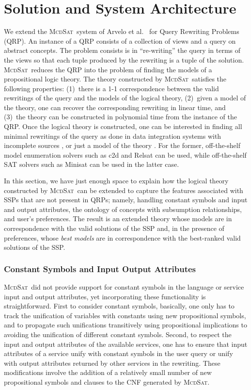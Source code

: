 \documentclass{llncs}
\newcommand{\mcdsat}{\textsc{McdSat}}
\begin{document}
\section{Solution and System Architecture}

We extend the \mcdsat\ system of Arvelo et al.\ \cite{arvelo:aaai06} for
Query Rewriting Problems (QRP). An instance of a QRP consists of a
collection of views and a query on abstract concepts. 
The problem consists is in ``re-writing'' the query in terms of the
views so that each tuple produced by the rewriting is a tuple of the
solution.
\mcdsat\ reduces the QRP into the problem of finding the models of
a propositional logic theory.
The theory constructed by \mcdsat\ satisfies the following properties:
(1)~there is a 1-1 correspondence between the valid rewritings of the
query and the models of the logical theory, (2)~given a model of the theory,
one can recover the corresponding rewriting in linear time, and
(3)~the theory can be constructed in polynomial time from the instance 
of the QRP.
Once the logical theory is constructed, one can be interested in finding
all minimal rewritings of the query as done in data integration systems
with incomplete sources \cite{Ullman00}, or just a model of the theory
\cite{refs}. For the former, off-the-shelf model enumeration solvers
such as c2d \cite{c2d} and Relsat \cite{relsat} can be used, while 
off-the-shelf SAT solvers such as Minisat \cite{minisat} can be used in the
latter case.

In this section, we have just enough space to explain how the logical
theory constructed by \mcdsat\ can be extended to capture the features
associated with SSPs that are not present in QRPs; namely, handling
constant symbols and input and output attributes, the ontology of
concepts with subsumption relationships, and user's preferences. The
result is an extended theory whose models are in correspondence with
the valid solutions of the SSP and, in the presence of preferences,
whose \emph{best models} are in correspondence with the best-ranked
valid solutions of the SSP.

\subsubsection{Constant Symbols and Input Output Attributes}

\mcdsat\ did not provide support for constant symbols in the language
or service  input and output attributes, yet incorporating these
functionality is straightforward.  First to consider constant symbols,
basically, one only has to track the unification of variables with
constants using new propositional symbols, and to propagate such
unifications transitively using propositional implications to avoiding
the unification of different constant symbols. Second, to respect the
input and output attributes of the available services, one has to
ensure that input attributes of a service unify with constant symbols
in the user query or unify with output attributes returned by other
services in the rewriting. These modifications involve the addition of
a relatively small number of new propositional symbols and clauses to
the CNF generated by \mcdsat.
\end{document}
